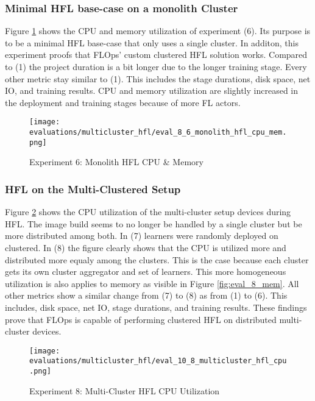 \subsubsection{Minimal HFL base-case on a monolith Cluster}

Figure \ref{fig:eval_6_cpu_mem} shows the CPU and memory utilization of experiment (6).
Its purpose is to be a minimal HFL base-case that only uses a single cluster.
In additon, this experiment proofs that FLOps' custom clustered HFL solution works.
Compared to (1) the project duration is a bit longer due to the longer training stage.
Every other metric stay similar to (1).
This includes the stage durations, disk space, net IO, and training results.
CPU and memory utilization are slightly increased in the deployment and training stages because of more FL actors.

\begin{figure}[H]
    \begin{adjustwidth}{-0.2\paperwidth}{-0.2\paperwidth}
        \centering
        \texttt{[image: evaluations/multicluster\_hfl/eval\_8\_6\_monolith\_hfl\_cpu\_mem.png]}
        \caption{Experiment 6: Monolith HFL CPU \& Memory}
        \label{fig:eval_6_cpu_mem}
    \end{adjustwidth}
\end{figure}

\subsubsection{HFL on the Multi-Clustered Setup}

Figure \ref{fig:eval_8_cpu} shows the CPU utilization of the multi-cluster setup devices during HFL.
The image build seems to no longer be handled by a single cluster but be more distributed among both.
In (7) learners were randomly deployed on clustered.
In (8) the figure clearly shows that the CPU is utilized more and distributed more equaly among the clusters.
This is the case because each cluster gets its own cluster aggregator and set of learners.
This more homogeneous utilization is also applies to memory as visible in Figure \ref{fig:eval_8_mem}.
All other metrics show a similar change from (7) to (8) as from (1) to (6).
This includes, disk space, net IO, stage durations, and training results.
These findings prove that FLOps is capable of performing clustered HFL on distributed multi-cluster devices.


\begin{figure}[H]
    \begin{adjustwidth}{-0.2\paperwidth}{-0.2\paperwidth}
        \centering
        \texttt{[image: evaluations/multicluster\_hfl/eval\_10\_8\_multicluster\_hfl\_cpu.png]}
        \caption{Experiment 8: Multi-Cluster HFL CPU Utilization}
        \label{fig:eval_8_cpu}
    \end{adjustwidth}
\end{figure}

